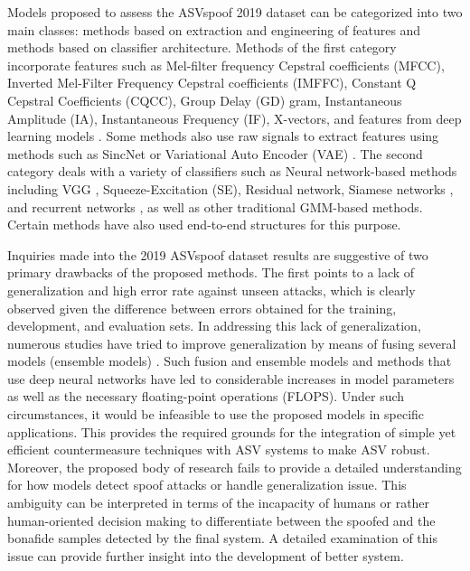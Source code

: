 \documentclass[a4paper]{article}
\begin{document}
Models proposed to assess the ASVspoof 2019 dataset can be categorized into two main classes: methods based on extraction and engineering of features and methods based on classifier architecture. Methods of the first category incorporate features such as Mel-filter frequency Cepstral coefficients (MFCC), Inverted Mel-Filter Frequency Cepstral coefficients (IMFFC), Constant Q Cepstral Coefficients (CQCC), Group Delay (GD) gram, Instantaneous Amplitude (IA), Instantaneous Frequency (IF), X-vectors, and features from deep learning models \cite{10cai2019dku,11todisco2016new,12alam2018boosting,13suthokumar2018modulation,14li2018multiple,15xiao2015spoofing,27kamble2020amplitude,34qian2016deep}. Some methods also use raw signals to extract features using methods such as SincNet \cite{16zeinali2019detecting} or Variational Auto Encoder (VAE) \cite{17chettri2020deep}. The second category deals with a variety of classifiers such as Neural network-based methods including VGG \cite{16zeinali2019detecting}, Squeeze-Excitation (SE), Residual network, Siamese networks \cite{18lai2019assert}, and recurrent networks \cite{19huang2020audio}, as well as other traditional GMM-based methods. Certain methods have also used end-to-end structures for this purpose.

Inquiries made into the 2019 ASVspoof dataset results are suggestive of two primary drawbacks of the proposed methods. The first points to a lack of generalization and high error rate against unseen attacks, which is clearly observed given the difference between errors obtained for the training, development, and evaluation sets. In addressing this lack of generalization, numerous studies have tried to improve generalization by means of fusing several models (ensemble models) \cite{20korshunov2017impact}. Such fusion and ensemble models and methods that use deep neural networks have led to considerable increases in model parameters as well as the necessary floating-point operations (FLOPS). Under such circumstances, it would be infeasible to use the proposed models in specific applications. This provides the required grounds for the integration of simple yet efficient countermeasure techniques with ASV systems to make ASV robust. Moreover, the proposed body of research fails to provide a detailed understanding for how models detect spoof attacks or handle generalization issue. This ambiguity can be interpreted in terms of the incapacity of humans or rather human-oriented decision making to differentiate between the spoofed and the bonafide samples detected by the final system. A detailed examination of this issue can provide further insight into the development of better system.
\end{document}
